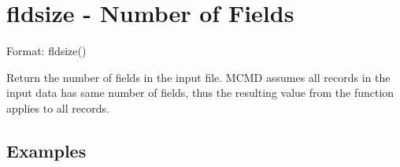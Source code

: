 
%

\section{fldsize - Number of Fields\label{sect:fldsize}}

Format: fldsize()

Return the number of fields in the input file. 
MCMD assumes all records in the input data has same number of fields, thus the resulting value from the function applies to all records. 


\subsection*{Examples}


%

